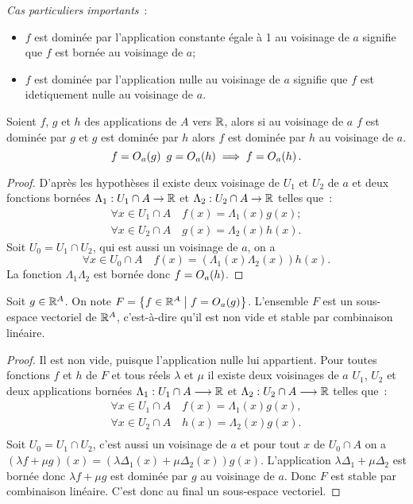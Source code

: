 \emph{Cas particuliers importants}~:
\begin{itemize}
\item $f$ est dominée par l'application constante égale à 1 au voisinage de $a$ signifie que $f$ est bornée au voisinage de $a$;
\item $f$ est dominée par l'application nulle au voisinage de $a$ signifie que $f$ est idetiquement nulle au voisinage de $a$.
\end{itemize}

\begin{prop}[Transitivité]
  Soient $f$, $g$ et $h$ des applications de $A$ vers $\mathbb{R}$, alors si au voisinage de $a$ $f$ est dominée par $g$ et $g$ est dominée par $h$ alors $f$ est dominée par $h$ au voisinage de $a$.
  \begin{equation}
    f=O\mathopen{}_{a}\left(g\right) \ g=O\mathopen{}_{a}\left(h\right) \implies f=O\mathopen{}_{a}\left(h\right).
  \end{equation}
\end{prop}
\begin{proof}
  D'après les hypothèses il existe deux voisinage de $U_1$ et $U_2$ de $a$ et deux fonctions bornées $\Lambda_1:U_1 \cap A \rightarrow \mathbb{R}$ et $\Lambda_2:U_2 \cap A \rightarrow \mathbb{R}$ telles que~:
  \begin{gather}
    \forall x \in U_1\cap A \quad f(x)=\Lambda_1(x)g(x);\\
    \forall x \in U_2\cap A \quad g(x)=\Lambda_2(x)h(x).
  \end{gather}
  Soit $U_0=U_1 \cap U_2$, qui est aussi un voisinage de $a$, on a
  \begin{equation}
    \forall x \in U_0 \cap A \quad f(x) = (\Lambda_1(x) \Lambda_2(x)) h(x).
  \end{equation}
  La fonction $\Lambda_1 \Lambda_2$ est bornée donc $f=O\mathopen{}_{a}\left(h\right)$.
\end{proof}
\begin{prop}
  Soit $g \in \mathbb{R}^A$. On note $F=\left\{f \in \mathbb{R}^A\mathrel{}\middle|\mathrel{}f=O\mathopen{}_{a}\left(g\right)\right\}$. L'ensemble $F$ est un sous-espace vectoriel de $\mathbb{R}^A$, c'est-à-dire qu'il est non vide et stable par combinaison linéaire.
\end{prop}
\begin{proof}
  Il est non vide, puisque l'application nulle lui appartient. Pour toutes fonctions $f$ et $h$ de $F$ et tous réels $\lambda$ et $\mu$ il existe deux voisinages de $a$ $U_1$, $U_2$ et deux  applications bornées $\Lambda_1:U_1 \cap A \longrightarrow \mathbb{R}$ et $\Lambda_2:U_2 \cap A \longrightarrow \mathbb{R}$  telles que~:
  \begin{gather}
    \forall x \in U_1\cap A \quad f(x)=\Lambda_1(x)g(x),\\
    \forall x \in U_2\cap A \quad h(x)=\Lambda_2(x)g(x).\\
  \end{gather}
  Soit $U_0=U_1 \cap U_2$, c'est aussi un voisinage de $a$ et pour tout $x$ de $U_0 \cap A$ on a $(\lambda f +\mu g)(x)=(\lambda\Delta_1(x)+\mu\Delta_2(x))g(x)$. L'application $\lambda\Delta_1+\mu\Delta_2$ est bornée donc $\lambda f + \mu g$ est dominée par $g$ au voisinage de $a$. Donc $F$ est stable par combinaison linéaire. C'est donc au final un sous-espace vectoriel.
\end{proof}
